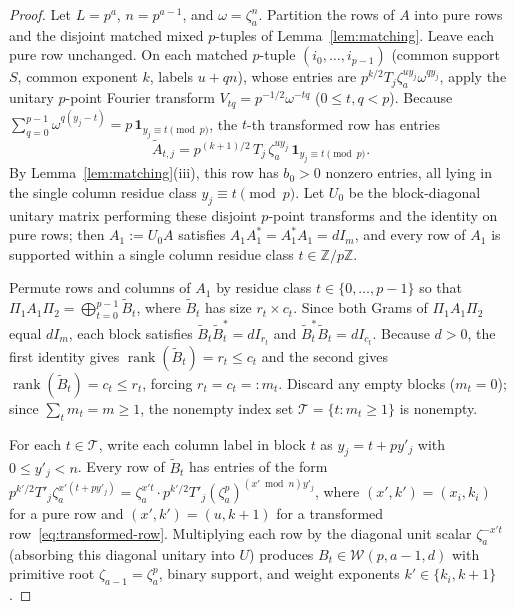 \documentclass[11pt,reqno]{amsart}
\numberwithin{equation}{section}
\theoremstyle{definition}
\theoremstyle{remark}
\newcommand{\Z}{\mathbb{Z}}
\newcommand{\rank}{\operatorname{rank}}
\begin{document}
\begin{proof}
Let $L=p^a$, $n=p^{a-1}$, and $\omega=\zeta_a^n$. Partition the rows of $A$ into pure rows and the disjoint matched mixed $p$-tuples of Lemma~\ref{lem:matching}. Leave each pure row unchanged. On each matched $p$-tuple $(i_0,\ldots,i_{p-1})$ (common support $S$, common exponent $k$, labels $u+qn$), whose entries are $p^{k/2}T_j \zeta_a^{uy_j}\omega^{qy_j}$, apply the unitary $p$-point Fourier transform $V_{tq}=p^{-1/2}\omega^{-tq}$ ($0\le t,q<p$). Because $\sum_{q=0}^{p-1}\omega^{q(y_j-t)}=p\,\mathbf{1}_{y_j\equiv t\pmod p}$, the $t$-th transformed row has entries
\begin{equation}
\label{eq:transformed-row}
\widetilde{A}_{t,j} = p^{(k+1)/2}\,T_j\,\zeta_a^{uy_j}\,\mathbf{1}_{y_j\equiv t\pmod p}.
\end{equation}
By Lemma~\ref{lem:matching}(iii), this row has $b_0>0$ nonzero entries, all lying in the single column residue class $y_j\equiv t\pmod p$. Let $U_0$ be the block-diagonal unitary matrix performing these disjoint $p$-point transforms and the identity on pure rows; then $A_1:=U_0 A$ satisfies $A_1A_1^*=A_1^*A_1=dI_m$, and every row of $A_1$ is supported within a single column residue class $t\in\Z/p\Z$.

Permute rows and columns of $A_1$ by residue class $t\in\{0,\ldots,p-1\}$ so that $\Pi_1 A_1 \Pi_2 = \bigoplus_{t=0}^{p-1} \widetilde{B}_t$, where $\widetilde{B}_t$ has size $r_t\times c_t$. Since both Grams of $\Pi_1 A_1 \Pi_2$ equal $dI_m$, each block satisfies $\widetilde{B}_t \widetilde{B}_t^* = dI_{r_t}$ and $\widetilde{B}_t^* \widetilde{B}_t = dI_{c_t}$. Because $d>0$, the first identity gives $\rank(\widetilde{B}_t)=r_t\le c_t$ and the second gives $\rank(\widetilde{B}_t)=c_t\le r_t$, forcing $r_t=c_t=:m_t$. Discard any empty blocks ($m_t=0$); since $\sum_t m_t=m\ge 1$, the nonempty index set $\mathcal{T}=\{t:m_t\ge 1\}$ is nonempty.

For each $t\in\mathcal{T}$, write each column label in block $t$ as $y_j=t+py'_j$ with $0\le y'_j<n$. Every row of $\widetilde{B}_t$ has entries of the form $p^{k'/2}T'_j\zeta_a^{x'(t+py'_j)} = \zeta_a^{x't}\cdot p^{k'/2}T'_j (\zeta_a^p)^{(x'\bmod n)y'_j}$, where $(x',k')=(x_i,k_i)$ for a pure row and $(x',k')=(u,k+1)$ for a transformed row~\eqref{eq:transformed-row}. Multiplying each row by the diagonal unit scalar $\zeta_a^{-x't}$ (absorbing this diagonal unitary into $U$) produces $B_t\in\mathcal{W}(p,a-1,d)$ with primitive root $\zeta_{a-1}=\zeta_a^p$, binary support, and weight exponents $k'\in\{k_i,k+1\}$.
\end{proof}
\end{document}
